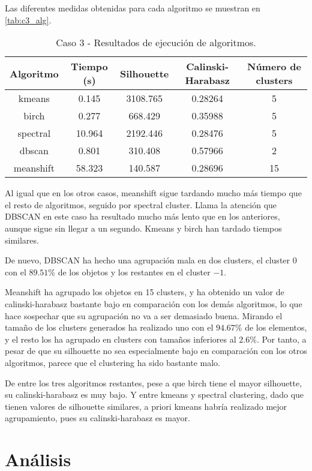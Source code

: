 Las diferentes medidas obtenidas para cada algoritmo se muestran en \eqref{tab:c3_alg}.

\begin{table}[H]
\centering
\caption{Caso 3 - Resultados de ejecución de algoritmos.}
\label{tab:c3_alg}
\begin{tabular}{ccccc}
\toprule
 Algoritmo & Tiempo (s) & Silhouette & Calinski-Harabasz & Número de clusters \\
\midrule
kmeans & 0.145 & 3108.765 & 0.28264 & 5 \\
birch & 0.277 & 668.429 & 0.35988 & 5 \\
spectral & 10.964 & 2192.446 & 0.28476 & 5 \\
dbscan & 0.801 & 310.408 & 0.57966 & 2 \\
meanshift & 58.323 & 140.587 & 0.28696 & 15 \\
\bottomrule
\end{tabular}
\end{table}

Al igual que en los otros casos, meanshift sigue tardando mucho más tiempo que el resto de algoritmos, seguido por spectral cluster. Llama la atención que DBSCAN en este caso ha resultado mucho más lento que en los anteriores, aunque sigue sin llegar a un segundo. Kmeans y birch han tardado tiempos similares.

De nuevo, DBSCAN ha hecho una agrupación mala en dos clusters, el cluster $0$ con el $89.51\%$ de los objetos y los restantes en el cluster $-1$.

Meanshift ha agrupado los objetos en 15 clusters, y ha obtenido un valor de calinski-harabasz bastante bajo en comparación con los demás algoritmos, lo que hace sospechar que su agrupación no va a ser demasiado buena. Mirando el tamaño de los clusters generados ha realizado uno con el $94.67\%$ de los elementos, y el resto los ha agrupado en clusters con tamaños inferiores al $2.6\%$. Por tanto, a pesar de que su silhouette no sea especialmente bajo en comparación con los otros algoritmos, parece que el clustering ha sido bastante malo.

De entre los tres algoritmos restantes, pese a que birch tiene el mayor silhouette, su calinski-harabasz es muy bajo. Y entre kmeans y spectral clustering, dado que tienen valores de silhouette similares, a priori kmeans habría realizado mejor agrupamiento, pues su calinski-harabasz es mayor.


\section{Análisis}


